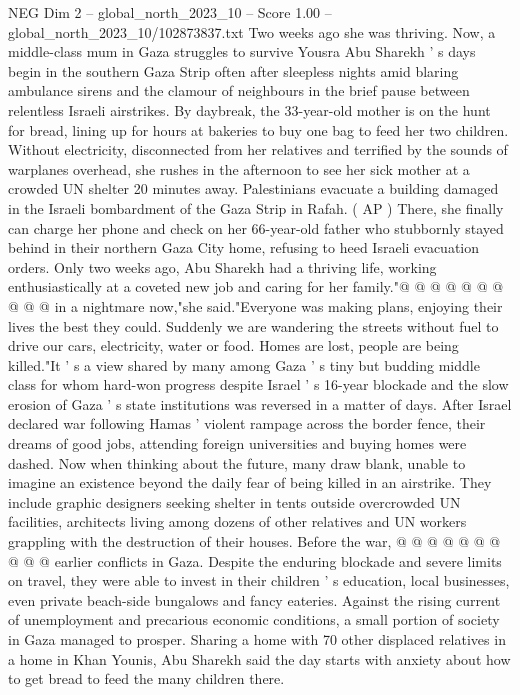 \begin{textsample}{NEG Dim 2 – global\_north\_2023\_10 – Score 1.00 – global\_north\_2023\_10/102873837.txt}  \label{ex:f2_neg_303}
Two weeks ago she was thriving.
Now, a middle-class mum in Gaza struggles to survive Yousra Abu Sharekh ' s days begin in the southern Gaza Strip often after sleepless nights amid blaring ambulance sirens and the clamour of neighbours in the brief pause between relentless Israeli airstrikes.
By daybreak, the 33-year-old mother is on the hunt for bread, lining up for hours at bakeries to buy one bag to feed her two children.
Without electricity, disconnected from her relatives and terrified by the sounds of warplanes overhead, she rushes in the afternoon to see her sick mother at a crowded UN shelter 20 minutes away.
Palestinians evacuate a building damaged in the Israeli bombardment of the Gaza Strip in Rafah. ( AP ) There, she finally can charge her phone and check on her 66-year-old father who stubbornly stayed behind in their northern Gaza City home, refusing to heed Israeli evacuation orders.
Only two weeks ago, Abu Sharekh had a thriving life, working enthusiastically at a coveted new job and caring for her family."@ @ @ @ @ @ @ @ @ @ in a nightmare now,"she said."Everyone was making plans, enjoying their lives the best they could.
Suddenly we are wandering the streets without fuel to drive our cars, electricity, water or food.
Homes are lost, people are being killed."It ' s a view shared by many among Gaza ' s tiny but budding middle class for whom hard-won progress despite Israel ' s 16-year blockade and the slow erosion of Gaza ' s state institutions was reversed in a matter of days.
After Israel declared war following Hamas ' violent rampage across the border fence, their dreams of good jobs, attending foreign universities and buying homes were dashed.
Now when thinking about the future, many draw blank, unable to imagine an existence beyond the daily fear of being killed in an airstrike.
They include graphic designers seeking shelter in tents outside overcrowded UN facilities, architects living among dozens of other relatives and UN workers grappling with the destruction of their houses.
Before the war, @ @ @ @ @ @ @ @ @ @ earlier conflicts in Gaza.
Despite the enduring blockade and severe limits on travel, they were able to invest in their children ' s education, local businesses, even private beach-side bungalows and fancy eateries.
Against the rising current of unemployment and precarious economic conditions, a small portion of society in Gaza managed to prosper.
Sharing a home with 70 other displaced relatives in a home in Khan Younis, Abu Sharekh said the day starts with anxiety about how to get bread to feed the many children there.

\end{textsample}
